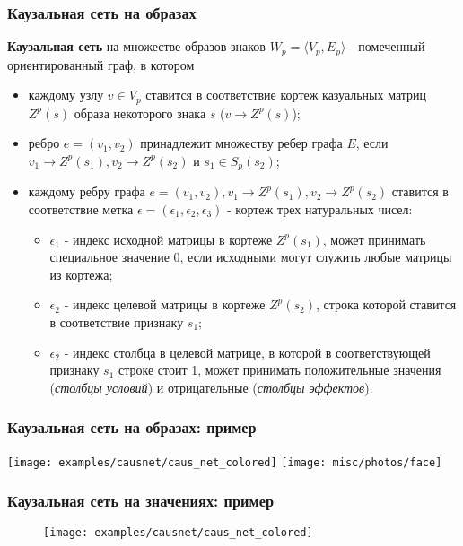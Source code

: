 \documentclass[default]{beamer}
\begin{document}
	\begin{frame}
		\frametitle{Каузальная сеть на образах}
		\footnotesize
		\textbf{Каузальная сеть} на множестве образов знаков $W_p=\langle V_p, E_p \rangle$ - помеченный ориентированный граф, в котором
		\begin{itemize}
			\item каждому узлу $v\in V_p$ ставится в соответствие кортеж казуальных матриц $Z^p(s)$ образа некоторого знака $s$ ($v\rightarrow Z^p(s)$);
			\item ребро $e=(v_1, v_2)$ принадлежит множеству ребер графа $E$, если $v_1\rightarrow Z^p(s_1), v_2\rightarrow Z^p(s_2)$ и $s_1\in S_p(s_2)$;
			\item каждому ребру графа $e=(v_1, v_2), v_1\rightarrow Z^p(s_1), v_2\rightarrow Z^p(s_2)$ ставится в соответствие метка $\epsilon=(\epsilon_1,\epsilon_2,\epsilon_3)$ - кортеж трех натуральных чисел:
			\begin{itemize}
				\item $\epsilon_1$ - индекс исходной матрицы в кортеже $Z^p(s_1)$, может принимать специальное значение 0, если исходными могут служить любые матрицы из кортежа;
				\item $\epsilon_2$ - индекс целевой матрицы в кортеже $Z^p(s_2)$, строка которой ставится в соответствие признаку $s_1$;
				\item $\epsilon_2$ - индекс столбца в целевой матрице, в которой в соответствующей признаку $s_1$ строке стоит 1, может принимать положительные значения (\textit{столбцы условий}) и отрицательные (\textit{столбцы эффектов}).
			\end{itemize}		
		\end{itemize}
	\end{frame}
		
	\begin{frame}
		\frametitle{Каузальная сеть на образах: пример}
		
		\centering
		\texttt{[image: examples/causnet/caus\_net\_colored]}
		\texttt{[image: misc/photos/face]}
	\end{frame}
		
	\begin{frame}
		\frametitle{Каузальная сеть на значениях: пример}
		
		\begin{figure}
		\texttt{[image: examples/causnet/caus\_net\_colored]}
		\end{figure}
		
	\end{frame}
		
\end{document}
